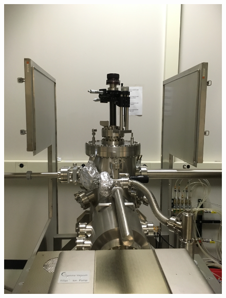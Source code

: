 \begin{enumerate}
\begin{figure}[H]	\vfill
	\begin{minipage}[c]{0.33\linewidth}  %
		\centering
		\includegraphics[width=1\textwidth, angle=270]{panels1.jpg} %
	\end{minipage}\hfill
	\begin{minipage}[c]{0.33\linewidth}
		\centering

\end{minipage}
\end{figure}
\end{enumerate}
